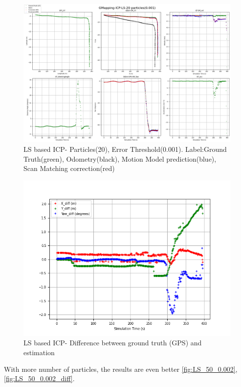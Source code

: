     \begin{figure}[h] 
        \includegraphics[height=0.6\textwidth]{images/GMapping-ICP-LS-20 particles(0.001)_PositionParameters.png}
        \caption{LS based ICP- Particles(20), Error Threshold(0.001). Label:Ground Truth(green), Odometry(black), Motion Model prediction(blue), Scan Matching correction(red)}
        \label{fig:LS_20_0.002}
    \end{figure}
    \begin{figure}[h] 
        \includegraphics[height=0.4\textwidth]{images/GMapping-ICP-LS-20 particles(0.001)_True_vs_Crct.png}
        \caption{LS based ICP- Difference between ground truth (GPS) and estimation}
        \label{fig:LS_20_0.002_diff}
    \end{figure}
\clearpage
With more number of particles, the results are even better \ref{fig:LS_50_0.002}, \ref{fig:LS_50_0.002_diff}.
